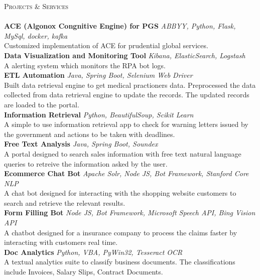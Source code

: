 \documentclass[a4paper]{article}
\newcommand{\lineunder} {
    \vspace*{-8pt} \\
    \hspace*{-18pt} \hrulefill \\
}
\newcommand{\header} [1] {
    {\hspace*{-18pt}\vspace*{6pt} \textsc{#1}}
    \vspace*{-6pt} \lineunder
}
\begin{document}
\vspace*{2mm}
\header{Projects \& Services}
{\textbf{ACE (Algonox Congnitive Engine) for PGS}} {\sl ABBYY, Python, Flask, MySql, docker, kafka} \\
Customized implementation of ACE for prudential global services.\\
\vspace*{2mm}
{\textbf{Data Visualization and Monitoring Tool}} {\sl Kibana, ElasticSearch, Logstash} \\
A alerting system which monitors the RPA bot logs.\\
\vspace*{2mm}
{\textbf{ETL Automation}} {\sl Java, Spring Boot, Selenium Web Driver} \\
Built data retrieval engine to get medical practioners data. Preprocessed the data collected from data
retrieval engine to update the records. The updated records are loaded to the portal.\\
\vspace*{2mm}
{\textbf{Information Retrieval }} {\sl Python, BeautifulSoup, Scikit Learn} \\
A simple to use information retrieval app to check for warning letters issued by the government and
actions to be taken with deadlines.\\
\vspace*{2mm}
{\textbf{Free Text Analysis}} {\sl Java, Spring Boot, Soundex} \\
A portal designed to search sales information with free text natural language queries to retreive the
information asked by the user. \\
{\textbf{Ecommerce Chat Bot}} {\sl Apache Solr, Node JS, Bot Framework, Stanford Core NLP} \\
A chat bot designed for interacting with the shopping website customers to search and retrieve the
relevant results.\\
\vspace*{2mm}
{\textbf{Form Filling Bot}} {\sl Node JS, Bot Framework, Microsoft Speech API, Bing Vision API} \\
A chatbot designed for a insurance company to process the claims faster by interacting with customers
real time.\\
\vspace*{2mm}
{\textbf{Doc Analytics}} {\sl Python, VBA, PyWin32, Tesseract OCR} \\
A textual analytics suite to classify business documents. The classifications include Invoices, Salary
Slips, Contract Documents.\\
\vspace*{2mm}
\vspace*{2mm}
\end{document}

